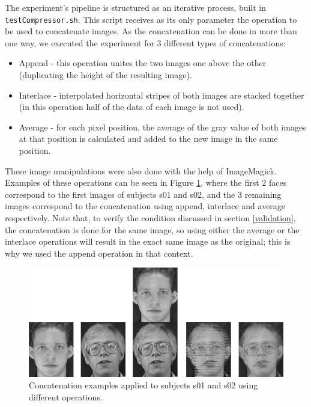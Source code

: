 \documentclass[12pt]{article}
\begin{document}
The experiment's pipeline is structured as an iterative process, built in \texttt{testCompressor.sh}.
This script receives as its only parameter the operation to be used to concatenate images.
As the concatenation can be done in more than one way, we executed the experiment for 3 different types of concatenations:
\vspace{-10pt}
\begin{itemize}[noitemsep]
  \item Append - this operation unites the two images one above the other (duplicating the height of the resulting image).
  \item Interlace - interpolated horizontal stripes of both images are stacked together (in this operation half of the data of each image is not used).
  \item Average - for each pixel position, the average of the gray value of both images at that position is calculated and added to the new image in the same position.
\end{itemize}
\vspace{-10pt}

\newpage
These image manipulations were also done with the help of ImageMagick.
Examples of these operations can be seen in Figure \ref{fig:3}, where the first 2 faces correspond to the first images of subjects s01 and s02, and the 
3 remaining images correspond to the concatenation using append, interlace and average respectively.
Note that, to verify the condition discussed in section \ref{validation}, the concatenation is done for the same image, so using either the average or the 
interlace operations will result in the exact same image as the original; this is why we used the append operation in that context.

\begin{figure}[H]
  \centering
  \begin{minipage}{.8\textwidth}
    \centering
    \includegraphics[width=\linewidth]{operations_example.png}
  \end{minipage}%
  \caption{Concatenation examples applied to subjects s01 and s02 using different operations.}
  \label{fig:3}
\end{figure}
\end{document}
